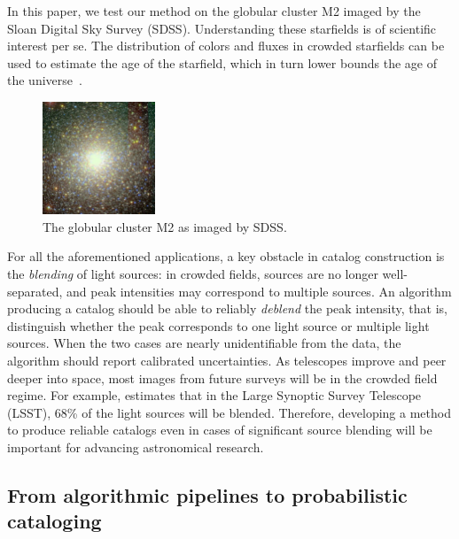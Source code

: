In this paper, we test our method on the globular cluster M2 imaged by the Sloan Digital Sky Survey (SDSS). 
Understanding these starfields is of scientific interest per se.
The distribution of colors and fluxes in crowded starfields 
can be used to estimate the age 
of the starfield, which in turn lower bounds the 
age of the universe~\cite{Isochrome_fitting}. 


\begin{figure}[!tb]
  \centering
    \includegraphics[width=0.3\textwidth]{figures/m2.png}
  \caption{The globular cluster M2 as imaged by SDSS. }
\end{figure}

For all the aforementioned applications, a key obstacle 
in catalog construction is the {\itshape blending} of light sources: in crowded fields, sources are no longer well-separated, and peak intensities may correspond to multiple sources. An algorithm producing a catalog should be able to reliably {\itshape deblend} the peak intensity, that is, distinguish whether the peak corresponds to one light source or 
multiple light sources. When the two cases are nearly unidentifiable from the data, the algorithm should 
report calibrated uncertainties. As telescopes improve and peer deeper into space, most images from future surveys will be in the crowded field regime. 
For example, \cite{Bosch_2017_LSST} estimates that in the Large Synoptic Survey Telescope (LSST), 68\% of the light sources will be blended. Therefore, developing a method to produce reliable catalogs even in cases of significant source blending will be important for advancing astronomical research. 

\subsection{From algorithmic pipelines to probabilistic cataloging}

